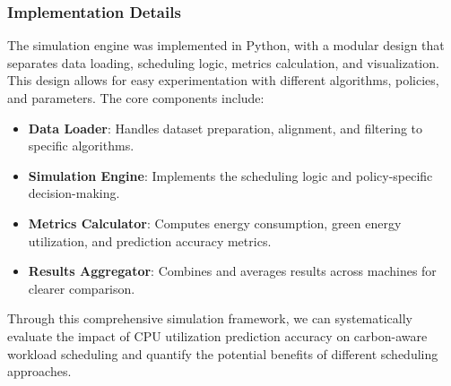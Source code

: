 \subsubsection{Implementation Details}
The simulation engine was implemented in Python, with a modular design that separates data loading, scheduling logic, metrics calculation, and visualization. This design allows for easy experimentation with different algorithms, policies, and parameters. The core components include:

\begin{itemize}
    \item \textbf{Data Loader}: Handles dataset preparation, alignment, and filtering to specific algorithms.
    
    \item \textbf{Simulation Engine}: Implements the scheduling logic and policy-specific decision-making.
    
    \item \textbf{Metrics Calculator}: Computes energy consumption, green energy utilization, and prediction accuracy metrics.
    
    \item \textbf{Results Aggregator}: Combines and averages results across machines for clearer comparison.
\end{itemize}

Through this comprehensive simulation framework, we can systematically evaluate the impact of CPU utilization prediction accuracy on carbon-aware workload scheduling and quantify the potential benefits of different scheduling approaches.